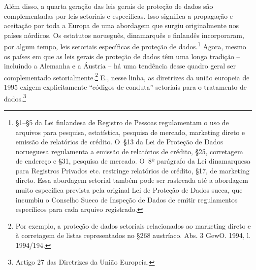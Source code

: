 Além disso, a quarta geração das leis gerais de proteção de dados são
complementadas por leis setoriais e específicas. Isso significa a
propagação e aceitação por toda a Europa de uma abordagem que surgiu
originalmente nos países nórdicos. Os estatutos norueguês, dinamarquês e
finlandês incorporaram, por algum tempo, leis setoriais específicas de
proteção de dados.\footnote{§1--§5 da Lei finlandesa de Registro de
  Pessoas regulamentam o uso de arquivos para pesquisa, estatística,
  pesquisa de mercado, marketing direto e emissão de relatórios de
  crédito. O~§13 da Lei de Proteção de Dados norueguesa regulamenta a
  emissão de relatórios de crédito, §25, corretagem de endereço e §31,
  pesquisa de mercado. O~8º parágrafo da Lei dinamarquesa para Registros
  Privados etc. restringe relatórios de crédito, §17, de marketing
  direto. Essa abordagem setorial também pode ser rastreada até a
  abordagem muito específica prevista pela original Lei de Proteção de
  Dados sueca, que incumbiu o Conselho Sueco de Inspeção de Dados de
  emitir regulamentos específicos para cada arquivo registrado.} Agora,
mesmo os países em que as leis gerais de proteção de dados têm uma longa
tradição -- incluindo a Alemanha e a Áustria -- há uma tendência desse
quadro geral ser complementado setorialmente.\footnote{Por exemplo, a
  proteção de dados setoriais relacionados ao marketing direto e à
  corretagem de listas representados no §268 austríaco. Abs. 3 GewO.
  1994, l. 1994/194.} E., nesse linha, as diretrizes da união
europeia de 1995 exigem explicitamente ``códigos de conduta'' setoriais
para o tratamento de dados.\footnote{Artigo 27 das Diretrizes da União
  Europeia.}

